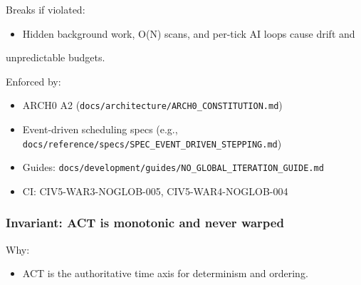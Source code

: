 \documentclass[9pt,a4paper,openany]{book}
\begin{document}
Breaks if violated:



\begin{itemize}
\item Hidden background work, O(N) scans, and per-\allowbreak{}tick AI loops cause drift and
\end{itemize}


unpredictable budgets.\allowbreak{}



Enforced by:



\begin{itemize}
\item ARCH0 A2 (\texttt{docs/\allowbreak{}architecture/\allowbreak{}ARCH0\_\allowbreak{}CONSTITUTION.\allowbreak{}md})
\end{itemize}


\begin{itemize}
\item Event-\allowbreak{}driven scheduling specs (e.\allowbreak{}g.\allowbreak{}, \texttt{docs/\allowbreak{}reference/\allowbreak{}specs/\allowbreak{}SPEC\_\allowbreak{}EVENT\_\allowbreak{}DRIVEN\_\allowbreak{}STEPPING.\allowbreak{}md})
\end{itemize}


\begin{itemize}
\item Guides: \texttt{docs/\allowbreak{}development/\allowbreak{}guides/\allowbreak{}NO\_\allowbreak{}GLOBAL\_\allowbreak{}ITERATION\_\allowbreak{}GUIDE.\allowbreak{}md}
\end{itemize}


\begin{itemize}
\item CI: CIV5-\allowbreak{}WAR3-\allowbreak{}NOGLOB-\allowbreak{}005, CIV5-\allowbreak{}WAR4-\allowbreak{}NOGLOB-\allowbreak{}004
\end{itemize}





\subsubsection{Invariant: ACT is monotonic and never warped}


Why:



\begin{itemize}
\item ACT is the authoritative time axis for determinism and ordering.\allowbreak{}
\end{itemize}
\end{document}
